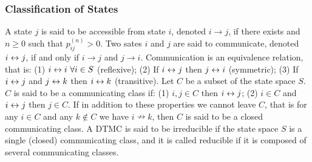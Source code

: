 \subsubsection*{Classification of States}
 A state $j$ is said to be accessible from state $i$, denoted $i \to j$, if there exists and $n \ge 0$ such that $p^{(n)}_{ij} > 0$.
 Two sates $i$ and $j$ are said to communicate, denoted $i \leftrightarrow j$, if and only if $i \to j$ and $j \to i$.
 Communication is an equivalence relation, that is: 
(1) $i \leftrightarrow i\ \forall i \in S$ (reflexive); 
(2) If $i \leftrightarrow j$ then $j \leftrightarrow i$ (symmetric); 
(3) If $i \leftrightarrow j$ and $j \leftrightarrow k$ then $i \leftrightarrow k$ (transitive).
 Let $C$ be a subset of the state space $S$. $C$ is said to be a communicating class if: 
(1) $i,j \in C$ then $i \leftrightarrow j$; 
(2) $i \in C$ and $i \leftrightarrow j$ then $j \in C$. 
If in addition to these properties we cannot leave $C$, that is for any $i \in C$ and any $k \notin C$ we have $i \nrightarrow k$, then $C$ is said to be a closed communicating class.
 A DTMC is said to be irreducible if the state space $S$ is a single (closed) communicating class, and it is called reducible if it is composed of several communicating classes.